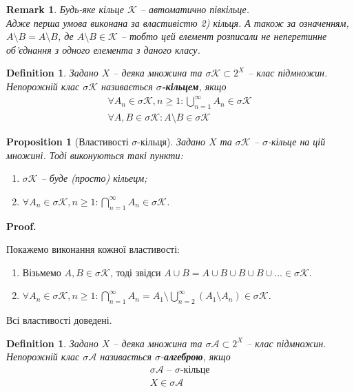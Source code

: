 \documentclass[a4paper, 10pt]{article}
\makeatletter
\theoremstyle{theoremdd}
\newtheorem{definition}[theorem]{Definition}
\newtheorem{proposition}[theorem]{Proposition}
\newtheorem{remark}[theorem]{Remark}
\renewenvironment{proof}[1][Proof.\\]{\par
\pushQED{\hfill \qed}%
\normalfont \topsep6\p@\@plus6\p@\relax
\trivlist
\item\relax
{\bfseries
#1\@addpunct{.}}\hspace\labelsep\ignorespaces
}{%
\popQED\endtrivlist\@endpefalse
}
\makeatother
\begin{document}
\begin{remark}
Будь-яке кільце $\mathcal{K}$ -- автоматично півкільце.\\
Адже перша умова виконана за властивістю 2) кільця. А також за означенням, $A \setminus B = A \setminus B$, де $A \setminus B \in \mathcal{K}$ -- тобто цей елемент розписали не неперетинне об'єднання з одного елемента з даного класу.
\end{remark}

\begin{definition}
Задано $X$ -- деяка множина та $\sigma \mathcal{K} \subset 2^X$ -- клас підмножин.\\
Непорожній клас $\sigma \mathcal{K}$ називається \textbf{$\sigma$-кільцем}, якщо
\begin{align*}
\forall A_n \in \sigma\mathcal{K}, n \geq 1: \bigcup_{n=1}^\infty A_n \in \sigma\mathcal{K} \\
\forall A,B \in \sigma\mathcal{K}: A \setminus B \in \sigma\mathcal{K}
\end{align*}
\end{definition}

\begin{proposition}[Властивості $\sigma$-кільця]
Задано $X$ та $\sigma\mathcal{K}$ -- $\sigma$-кільце на цій множині. Тоді виконуються такі пункти:
\begin{enumerate}[nosep,wide=0pt,label={\arabic*)}]
\item $\sigma \mathcal{K}$ -- буде (просто) кільецм;
\item $\forall A_n \in \sigma\mathcal{K}, n \geq 1: \displaystyle\bigcap_{n=1}^\infty A_n \in \sigma\mathcal{K}$.
\end{enumerate}
\end{proposition}

\begin{proof}
Покажемо виконання кожної властивості:
\begin{enumerate}[wide=0pt,label={\arabic*)}]
\item Візьмемо $A,B \in \sigma \mathcal{K}$, тоді звідси $A \cup B = A \cup B \cup B \cup B \cup \dots \in \sigma \mathcal{K}$.
\item $\forall A_n \in \sigma \mathcal{K}, n \geq 1: \displaystyle\bigcap_{n=1}^\infty A_n = A_1 \setminus \bigcup_{n=2}^\infty (A_1 \setminus A_n) \in \sigma \mathcal{K}$.
\end{enumerate}
Всі властивості доведені.
\end{proof}

\begin{definition}
Задано $X$ -- деяка множина та $\sigma\mathcal{A} \subset 2^X$ -- клас підмножин.\\
Непорожній клас $\sigma\mathcal{A}$ називається $\sigma$-\textbf{алгеброю}, якщо
\begin{align*}
\sigma\mathcal{A} \text{ -- $\sigma$-кільце} \\
X \in \sigma\mathcal{A}
\end{align*}
\end{definition}
\end{document}
